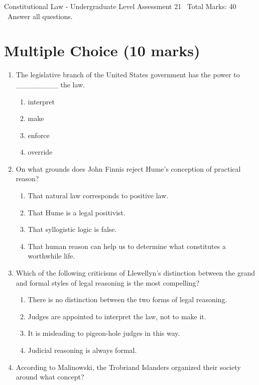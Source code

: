 \documentclass[12pt]{article}
\begin{document}
\begin{center}
Constitutional Law - Undergraduate Level Assessment 21 \
Total Marks: 40 \
Answer all questions.
\end{center}

\section*{Multiple Choice (10 marks)}
\begin{enumerate}[label=\arabic*.]
\item The legislative branch of the United States government has the power to \_\_\_\_\_\_\_\_ the law.
\begin{enumerate}[label=(\alph*)]
    \item interpret
    \item make
    \item enforce
    \item override
\end{enumerate}
\item On what grounds does John Finnis reject Hume's conception of practical reason?
\begin{enumerate}[label=(\alph*)]
    \item That natural law corresponds to positive law.
    \item That Hume is a legal positivist.
    \item That syllogistic logic is false.
    \item That human reason can help us to determine what constitutes a worthwhile life.
\end{enumerate}
\item Which of the following criticisms of Llewellyn's distinction between the grand and formal styles of legal reasoning is the most compelling?
\begin{enumerate}[label=(\alph*)]
    \item There is no distinction between the two forms of legal reasoning.
    \item Judges are appointed to interpret the law, not to make it.
    \item It is misleading to pigeon-hole judges in this way.
    \item Judicial reasoning is always formal.
\end{enumerate}
\item According to Malinowski, the Trobriand Islanders organized their society around what concept?
\begin{enumerate}[label=(\alph*)]

\end{enumerate}
\end{enumerate}
\end{document}

